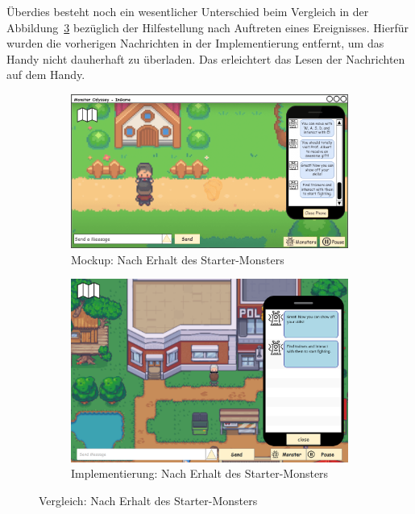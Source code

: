 Überdies besteht noch ein wesentlicher Unterschied beim Vergleich in der Abbildung~\ref{fig: Vergleich: Nach Erhalt des Starter-Monsters} bezüglich der Hilfestellung nach Auftreten eines Ereignisses. Hierfür wurden die vorherigen Nachrichten in der Implementierung entfernt, um das Handy nicht dauherhaft zu überladen. Das erleichtert das Lesen der Nachrichten auf dem Handy.
\begin{figure}[H]
    \centering
    \begin{subfigure}[b]{0.4\textwidth}
        \includegraphics[width=\textwidth]{images/mockups/Bonusfeatures/Helpsituation/PlayerAndPlayerIngameSixthNotification.png}
        \caption{Mockup: Nach Erhalt des Starter-Monsters}
        \label{fig: Mockup: Nach Erhalt des Starter-Monsters}
    \end{subfigure}
    \hfill
    \begin{subfigure}[b]{0.4\textwidth}
        \includegraphics[width=\textwidth]{images/implementation/Bonusfeatures/Helpsituation/StarterMonsterMessagesImp.png}
        \caption{Implementierung: Nach Erhalt des Starter-Monsters}
        \label{fig: Implementierung: Nach Erhalt des Starter-Monsters}
    \end{subfigure}
    \caption{Vergleich: Nach Erhalt des Starter-Monsters}
    \label{fig: Vergleich: Nach Erhalt des Starter-Monsters}
\end{figure}